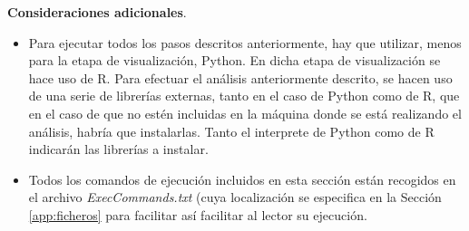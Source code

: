 \documentclass[10pt, spanish]{article}
\begin{document}
\begin{appendices}
\textbf{Consideraciones adicionales}. 
\begin{itemize}
\item Para ejecutar todos los pasos descritos anteriormente, hay que utilizar, menos para la etapa de visualización, Python. En dicha etapa de visualización se hace uso de R. Para efectuar el análisis anteriormente descrito, se hacen uso de una serie de librerías externas, tanto en el caso de Python como de R, que en el caso de que no estén incluidas en la máquina donde se está realizando el análisis, habría que instalarlas. Tanto el interprete de Python como de R indicarán las librerías a instalar.
\item Todos los comandos de ejecución incluidos en esta sección están recogidos en el archivo \textit{ExecCommands.txt} (cuya localización se especifica en la Sección \ref{app:ficheros} para facilitar así facilitar al lector su ejecución.

\end{itemize}




\end{appendices}




\end{document}
